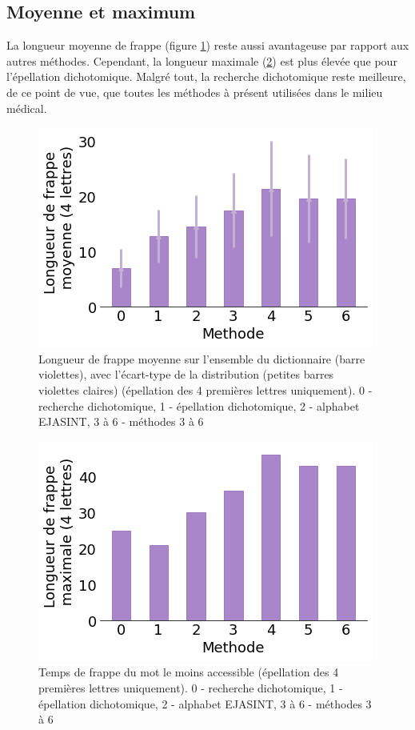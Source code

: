 \documentclass[twoside,twocolumn]{article}
\begin{document}
\subsection{Moyenne et maximum}

La longueur moyenne de frappe (figure \ref{mean4}) reste aussi avantageuse par rapport aux autres méthodes. Cependant, la longueur maximale (\ref{maxi4}) est plus élevée que pour l'épellation dichotomique. Malgré tout, la recherche dichotomique reste meilleure, de ce point de vue, que toutes les méthodes à présent utilisées dans le milieu médical.

\begin{center}
\begin{figure}
  \includegraphics[scale=0.5]{mean4.png}
  \caption{Longueur de frappe moyenne sur l'ensemble du dictionnaire (barre violettes), avec l'écart-type de la distribution (petites barres violettes claires) (épellation des 4 premières lettres uniquement). 0 - recherche dichotomique, 1 - épellation dichotomique, 2 - alphabet EJASINT, 3 à 6 - méthodes 3 à 6}
  \label{mean4}
\end{figure}
\end{center}

\begin{center}
\begin{figure}
  \includegraphics[scale=0.5]{frappe-maxi4.png}
  \caption{Temps de frappe du mot le moins accessible (épellation des 4 premières lettres uniquement). 0 - recherche dichotomique, 1 - épellation dichotomique, 2 - alphabet EJASINT, 3 à 6 - méthodes 3 à 6}
  \label{maxi4}
\end{figure}
\end{center}
\end{document}
